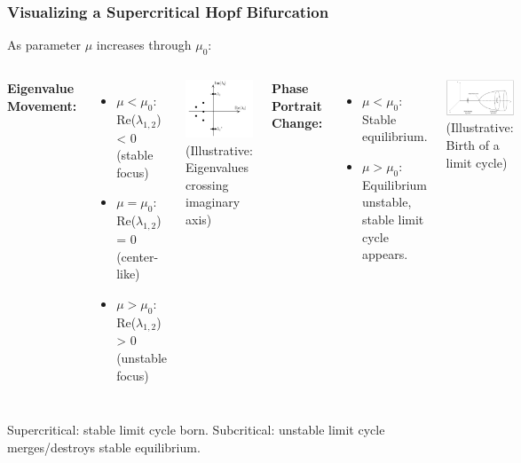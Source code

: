 \documentclass[aspectratio=169]{beamer}
\begin{document}
\begin{frame}{\insertsectionhead}
	\frametitle{Visualizing a Supercritical Hopf Bifurcation}
	As parameter $\mu$ increases through $\mu_0$:
	\begin{columns}[T]
		\textbf{Eigenvalue Movement:}
		\begin{itemize}
			\item $\mu < \mu_0$: Re($\lambda_{1,2}$) < 0 (stable focus)
			\item $\mu = \mu_0$: Re($\lambda_{1,2}$) = 0 (center-like)
			\item $\mu > \mu_0$: Re($\lambda_{1,2}$) > 0 (unstable focus)
		\end{itemize}
		\centering
		\includegraphics[width=0.8\linewidth]{pics/hopf-bif-eigenvalue-graph.png}\\
		\tiny (Illustrative: Eigenvalues crossing imaginary axis)

		\textbf{Phase Portrait Change:}
		\begin{itemize}
			\item $\mu < \mu_0$: Stable equilibrium.
			\item $\mu > \mu_0$: Equilibrium unstable, stable limit cycle appears.
		\end{itemize}
		\centering
		\includegraphics[width=0.8\linewidth]{pics/hopf-bif-pic.png}\\
		\tiny (Illustrative: Birth of a limit cycle)
	\end{columns}
	\vspace{0.5cm}
	\small Supercritical: stable limit cycle born. Subcritical: unstable limit cycle merges/destroys stable equilibrium.
\end{frame}
\end{document}
